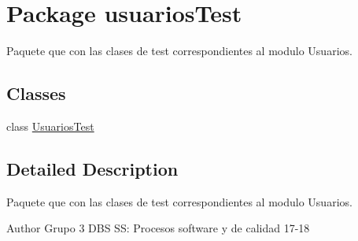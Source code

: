 \hypertarget{namespaceusuarios_test}{}\section{Package usuarios\+Test}
\label{namespaceusuarios_test}


Paquete que con las clases de test correspondientes al modulo Usuarios.  


\subsection*{Classes}
\begin{DoxyCompactItemize}
\item 
class \hyperlink{classusuarios_test_1_1_usuarios_test}{Usuarios\+Test}
\end{DoxyCompactItemize}


\subsection{Detailed Description}
Paquete que con las clases de test correspondientes al modulo Usuarios. 

\begin{DoxyAuthor}{Author}
Grupo 3 D\+BS SS\+: Procesos software y de calidad 17-\/18 
\end{DoxyAuthor}

